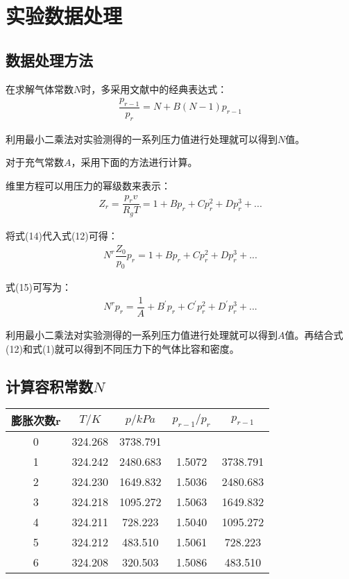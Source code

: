 \documentclass[UTF8,a4paper,10pt]{ctexart}
\begin{document}
\section{实验数据处理}
    \subsection{数据处理方法}
    在求解气体常数$N$时，多采用文献中的经典表达式：
    \begin{align}
    \dfrac{p_{r-1}}{p_{r}}=N+B(N-1)p_{r-1}
    \end{align}
    
    利用最小二乘法对实验测得的一系列压力值进行处理就可以得到$N$值。
    
    对于充气常数$A$，采用下面的方法进行计算。
    
    维里方程可以用压力的幂级数来表示：
    \begin{align}
    Z_{r}=\dfrac{p_{r}v}{R_{g}T}=1+Bp_{r}+Cp^{2}_{r}+Dp^{3}_{r}+...
    \end{align}
    
    将式(14)代入式(12)可得：
    \begin{align}
    N^{r}\dfrac{Z_{0}}{p_{0}}p_{r}=1+Bp_{r}+Cp^{2}_{r}+Dp^{3}_{r}+...
    \end{align}
    
    式(15)可写为：
    \begin{align}
    N^{r}p_{r}=\dfrac{1}{A}+B^{'}p_{r}+C^{'}p^{2}_{r}+D^{'}p^{3}_{r}+...
    \end{align}
    
    利用最小二乘法对实验测得的一系列压力值进行处理就可以得到$A$值。再结合式(12)和式(1)就可以得到不同压力下的气体比容和密度。
    \subsection{计算容积常数$N$}
    \begin{tabular}{|c|c|c|c|c|}
    	\hline 
    	膨胀次数r & $T/K$ & $p/kPa$ & $p_{r-1}/p_{r}$ & $p_{r-1}$ \\ 
    	\hline
    	0 & 324.268 & 3738.791 &  &  \\
    	\hline
    	1 & 324.242 & 2480.683 & 1.5072 & 3738.791 \\
    	\hline
    	2 & 324.230 & 1649.832 & 1.5036 & 2480.683 \\
    	\hline
    	3 & 324.218 & 1095.272 & 1.5063 & 1649.832 \\
    	\hline
    	4 & 324.211 & 728.223 & 1.5040 & 1095.272 \\
    	\hline
    	5 & 324.212 & 483.510 & 1.5061 & 728.223 \\
    	\hline
    	6 & 324.208 & 320.503 & 1.5086 & 483.510 \\
    	\hline
    \end{tabular}
\end{document}
